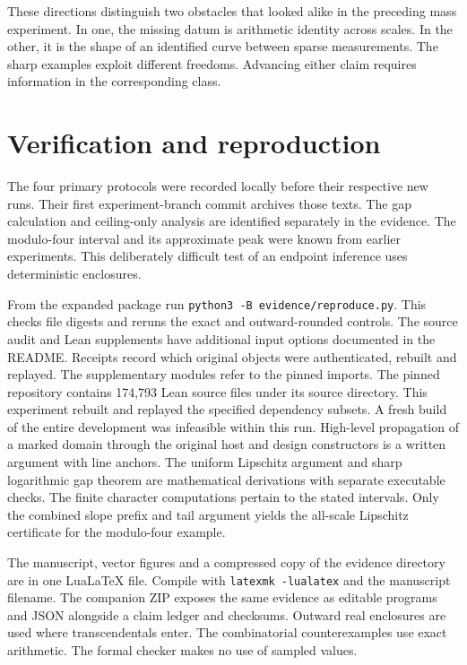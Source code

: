 \documentclass[12pt,letterpaper]{article}
\begin{document}
These directions distinguish two obstacles that looked alike in the preceding mass experiment. In one, the missing datum is arithmetic identity across scales. In the other, it is the shape of an identified curve between sparse measurements. The sharp examples exploit different freedoms. Advancing either claim requires information in the corresponding class.

\section{Verification and reproduction}
The four primary protocols were recorded locally before their respective new runs. Their first experiment-branch commit archives those texts. The gap calculation and ceiling-only analysis are identified separately in the evidence. The modulo-four interval and its approximate peak were known from earlier experiments. This deliberately difficult test of an endpoint inference uses deterministic enclosures.

From the expanded package run \texttt{python3 -B evidence/reproduce.py}. This checks file digests and reruns the exact and outward-rounded controls. The source audit and Lean supplements have additional input options documented in the README. Receipts record which original objects were authenticated, rebuilt and replayed. The supplementary modules refer to the pinned imports. The pinned repository contains 174,793 Lean source files under its source directory. This experiment rebuilt and replayed the specified dependency subsets. A fresh build of the entire development was infeasible within this run. High-level propagation of a marked domain through the original host and design constructors is a written argument with line anchors. The uniform Lipschitz argument and sharp logarithmic gap theorem are mathematical derivations with separate executable checks. The finite character computations pertain to the stated intervals. Only the combined slope prefix and tail argument yields the all-scale Lipschitz certificate for the modulo-four example.

The manuscript, vector figures and a compressed copy of the evidence directory are in one LuaLaTeX file. Compile with \texttt{latexmk -lualatex} and the manuscript filename. The companion ZIP exposes the same evidence as editable programs and JSON alongside a claim ledger and checksums. Outward real enclosures are used where transcendentals enter. The combinatorial counterexamples use exact arithmetic. The formal checker makes no use of sampled values.
\end{document}
